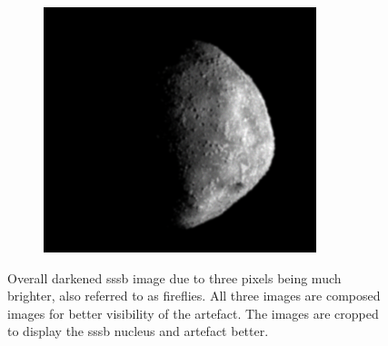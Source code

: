 \begin{figure}[htb]
\begin{subfigure}[b]{0.32\textwidth}
            \label{fig:render_dark_2}
        \end{subfigure}
        \begin{subfigure}[b]{0.32\textwidth}
            \centering
            \includegraphics[width=\textwidth]{doc/thesis/0_figures/composition_darkening/Inst_2017-08-15T115819-007000_center.png}
            \label{fig:render_dark_3}
        \end{subfigure}
    \caption{Overall darkened \gls{sssb} image due to three pixels being much brighter, also referred to as fireflies. All three images are composed images for better visibility of the artefact. The images are cropped to display the \gls{sssb} nucleus and artefact better.}
    \label{fig:render_dark}
\end{figure}

\clearpage

